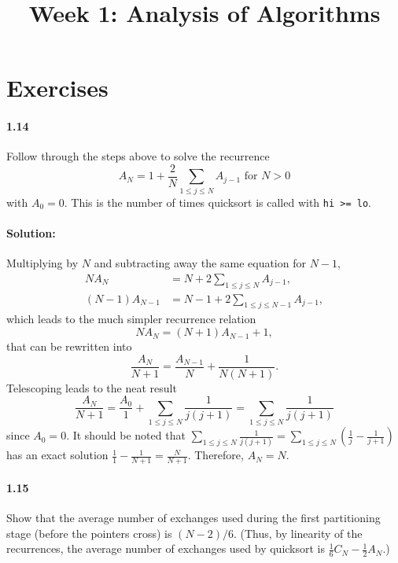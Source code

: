 \documentclass{article}
\begin{document}
\title{Week 1: Analysis of Algorithms}
\maketitle

\section*{Exercises}

\paragraph{1.14} Follow through the steps above to solve the recurrence
\begin{equation*}
  A_N = 1 + \frac{2}{N}\sum_{1 \leq j \leq N}A_{j - 1} \text{ for } N > 0
\end{equation*} with $A_0 = 0$. This is the number of times quicksort is called
with \verb|hi >= lo|.

\paragraph{Solution:} Multiplying by $N$ and subtracting away the same equation
for $N - 1$, \begin{align*}
  NA_N &= N + 2\sum_{1 \leq j \leq N}A_{j - 1}, \\
  (N - 1)A_{N - 1} &= N - 1 + 2\sum_{1 \leq j \leq N - 1}A_{j - 1},
\end{align*} which leads to the much simpler recurrence relation
\begin{equation*}
  NA_N = (N + 1)A_{N - 1} + 1,
\end{equation*} that can be rewritten into \begin{equation*}
  \frac{A_N}{N + 1} = \frac{A_{N - 1}}{N} + \frac{1}{N(N + 1)}.
\end{equation*} Telescoping leads to the neat result \begin{equation*}
  \frac{A_N}{N + 1} = \frac{A_0}{1} + \sum_{1 \leq j \leq N}\frac{1}{j(j + 1)}
    = \sum_{1 \leq j \leq N}\frac{1}{j(j + 1)}
\end{equation*} since $A_0 = 0$. It should be noted that $\sum_{1 \leq j \leq
N}\frac{1}{j(j + 1)} = \sum_{1 \leq j \leq N}\left(\frac{1}{j} - \frac{1}{j +
1}\right)$ has an exact solution $\frac{1}{1} - \frac{1}{N + 1} = \frac{N}{N +
1}$. Therefore, $A_N = N$.

\paragraph{1.15} Show that the average number of exchanges used during the
first partitioning stage (before the pointers cross) is $(N - 2)/6$. (Thus, by
linearity of the recurrences, the average number of exchanges used by quicksort
is $\frac{1}{6}C_N - \frac{1}{2}A_N$.)
\end{document}
